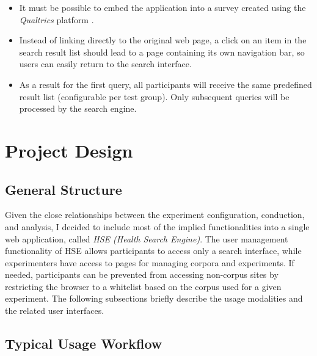 \documentclass[a4paper]{usiinfbachelorproject}
\begin{document}
\begin{itemize}

    \item It must be possible to embed the application into a survey created using the \emph{Qualtrics} platform \cite{qualtricsHome}. 

    \item Instead of linking directly to the original web page, a click on an item in the search result list should lead
to a page containing its own navigation bar, so users can easily return to the search interface.

    \item As a result for the first query, all participants will receive the same predefined result list (configurable per
test group). Only subsequent queries will be processed by the search engine.

\end{itemize}

\section{\textbf{Project Design}} \label{sec:design}

\subsection{General Structure} \label{sec:designGeneral}

Given the close relationships between the experiment configuration, conduction, and analysis, I decided to include
most of the implied functionalities into a single web application, called \emph{HSE (Health Search Engine)}.
The user management functionality of HSE allows participants to access only a search interface, while experimenters
have access to pages for managing corpora and experiments. If needed, participants can be prevented from
accessing non-corpus sites by restricting the browser to a whitelist based on the corpus used for a given experiment.
The following subsections briefly describe the usage modalities and the related user interfaces.

\subsection{Typical Usage Workflow} \label{sec:designWorkflow}
\end{document}
